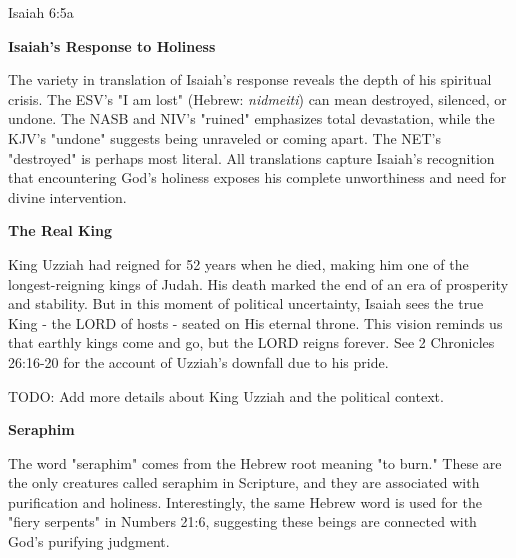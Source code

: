 \documentclass[11pt]{article}
\begin{document}
\begin{biblecomparison}{Isaiah 6:5a}






\end{biblecomparison}

{\large\bfseries Isaiah's Response to Holiness}
{\vspace{1em}}

The variety in translation of Isaiah's response reveals the depth of his spiritual crisis. The ESV's "I am lost" (Hebrew: \textit{nidmeiti}) can mean destroyed, silenced, or undone. The NASB and NIV's "ruined" emphasizes total devastation, while the KJV's "undone" suggests being unraveled or coming apart. The NET's "destroyed" is perhaps most literal. All translations capture Isaiah's recognition that encountering God's holiness exposes his complete unworthiness and need for divine intervention.

{\vspace{1em}}

{\large\bfseries The Real King}
{\vspace{1em}}

King Uzziah had reigned for 52 years when he died, making him one of the longest-reigning kings of Judah. His death marked the end of an era of prosperity and stability. But in this moment of political uncertainty, Isaiah sees the true King - the LORD of hosts - seated on His eternal throne. This vision reminds us that earthly kings come and go, but the LORD reigns forever. See 2 Chronicles 26:16-20 for the account of Uzziah's downfall due to his pride.

{\vspace{1em}}
TODO: Add more details about King Uzziah and the political context.

{\large\bfseries Seraphim}
{\vspace{1em}}

The word "seraphim" comes from the Hebrew root meaning "to burn." These are the only creatures called seraphim in Scripture, and they are associated with purification and holiness. Interestingly, the same Hebrew word is used for the "fiery serpents" in Numbers 21:6, suggesting these beings are connected with God's purifying judgment.
\end{document}
